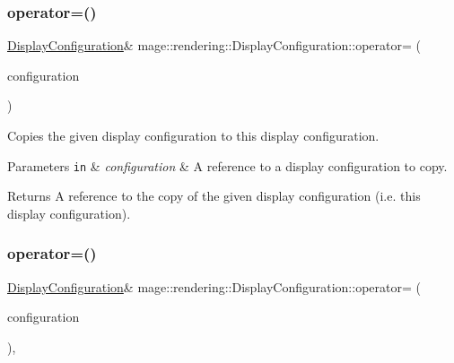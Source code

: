 \subsubsection{\texorpdfstring{operator=()}{operator=()}\hspace{0.1cm}{\footnotesize\ttfamily [1/2]}}
{\footnotesize\ttfamily \mbox{\hyperlink{classmage_1_1rendering_1_1_display_configuration}{Display\+Configuration}}\& mage\+::rendering\+::\+Display\+Configuration\+::operator= (\begin{DoxyParamCaption}\item[{const \mbox{\hyperlink{classmage_1_1rendering_1_1_display_configuration}{Display\+Configuration}} \&}]{configuration }\end{DoxyParamCaption})\hspace{0.3cm}{\ttfamily [default]}}

Copies the given display configuration to this display configuration.


\begin{DoxyParams}[1]{Parameters}
\mbox{\tt in}  & {\em configuration} & A reference to a display configuration to copy. \\
\hline
\end{DoxyParams}
\begin{DoxyReturn}{Returns}
A reference to the copy of the given display configuration (i.\+e. this display configuration). 
\end{DoxyReturn}
\mbox{\label{classmage_1_1rendering_1_1_display_configuration_a309591557673c77b7157012136fe2fc9}} 
\subsubsection{\texorpdfstring{operator=()}{operator=()}\hspace{0.1cm}{\footnotesize\ttfamily [2/2]}}
{\footnotesize\ttfamily \mbox{\hyperlink{classmage_1_1rendering_1_1_display_configuration}{Display\+Configuration}}\& mage\+::rendering\+::\+Display\+Configuration\+::operator= (\begin{DoxyParamCaption}\item[{\mbox{\hyperlink{classmage_1_1rendering_1_1_display_configuration}{Display\+Configuration}} \&\&}]{configuration }\end{DoxyParamCaption})\hspace{0.3cm}{\ttfamily [default]}, {\ttfamily [noexcept]}}


